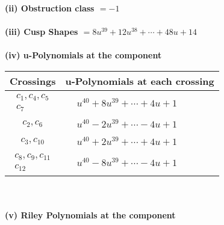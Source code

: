 \documentclass[1p]{elsarticle_modified}
\theoremstyle{definition}
\begin{document}
\flushleft \textbf{(ii) Obstruction class $= -1$}\\~\\
\flushleft \textbf{(iii) Cusp Shapes $= 8 u^{39}+12 u^{38}+\cdots+48 u+14$}\\~\\
\newpage\renewcommand{\arraystretch}{1}
\flushleft \textbf{(iv) u-Polynomials at the component}\newline \\
\begin{tabular}{m{50pt}|m{274pt}}
Crossings & \hspace{64pt}u-Polynomials at each crossing \\
\hline $$\begin{aligned}c_{1},c_{4},c_{5}\\c_{7}\end{aligned}$$&$\begin{aligned}
&u^{40}+8 u^{39}+\cdots+4 u+1
\end{aligned}$\\
\hline $$\begin{aligned}c_{2},c_{6}\end{aligned}$$&$\begin{aligned}
&u^{40}-2 u^{39}+\cdots-4 u+1
\end{aligned}$\\
\hline $$\begin{aligned}c_{3},c_{10}\end{aligned}$$&$\begin{aligned}
&u^{40}+2 u^{39}+\cdots+4 u+1
\end{aligned}$\\
\hline $$\begin{aligned}c_{8},c_{9},c_{11}\\c_{12}\end{aligned}$$&$\begin{aligned}
&u^{40}-8 u^{39}+\cdots-4 u+1
\end{aligned}$\\
\hline
\end{tabular}\\~\\
\newpage\renewcommand{\arraystretch}{1}
\flushleft \textbf{(v) Riley Polynomials at the component}\newline \\
\end{document}
